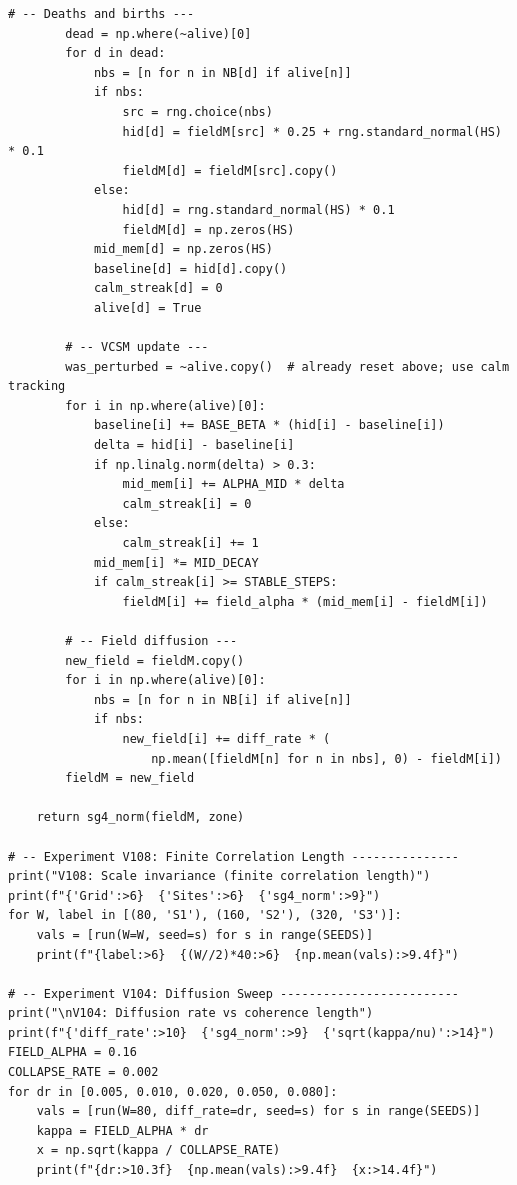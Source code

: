 \documentclass[11pt]{article}
\begin{document}
\begin{lstlisting}[caption={paper3\_propagation\_repro.py}]
        # -- Deaths and births ---
        dead = np.where(~alive)[0]
        for d in dead:
            nbs = [n for n in NB[d] if alive[n]]
            if nbs:
                src = rng.choice(nbs)
                hid[d] = fieldM[src] * 0.25 + rng.standard_normal(HS) * 0.1
                fieldM[d] = fieldM[src].copy()
            else:
                hid[d] = rng.standard_normal(HS) * 0.1
                fieldM[d] = np.zeros(HS)
            mid_mem[d] = np.zeros(HS)
            baseline[d] = hid[d].copy()
            calm_streak[d] = 0
            alive[d] = True

        # -- VCSM update ---
        was_perturbed = ~alive.copy()  # already reset above; use calm tracking
        for i in np.where(alive)[0]:
            baseline[i] += BASE_BETA * (hid[i] - baseline[i])
            delta = hid[i] - baseline[i]
            if np.linalg.norm(delta) > 0.3:
                mid_mem[i] += ALPHA_MID * delta
                calm_streak[i] = 0
            else:
                calm_streak[i] += 1
            mid_mem[i] *= MID_DECAY
            if calm_streak[i] >= STABLE_STEPS:
                fieldM[i] += field_alpha * (mid_mem[i] - fieldM[i])

        # -- Field diffusion ---
        new_field = fieldM.copy()
        for i in np.where(alive)[0]:
            nbs = [n for n in NB[i] if alive[n]]
            if nbs:
                new_field[i] += diff_rate * (
                    np.mean([fieldM[n] for n in nbs], 0) - fieldM[i])
        fieldM = new_field

    return sg4_norm(fieldM, zone)

# -- Experiment V108: Finite Correlation Length ---------------
print("V108: Scale invariance (finite correlation length)")
print(f"{'Grid':>6}  {'Sites':>6}  {'sg4_norm':>9}")
for W, label in [(80, 'S1'), (160, 'S2'), (320, 'S3')]:
    vals = [run(W=W, seed=s) for s in range(SEEDS)]
    print(f"{label:>6}  {(W//2)*40:>6}  {np.mean(vals):>9.4f}")

# -- Experiment V104: Diffusion Sweep -------------------------
print("\nV104: Diffusion rate vs coherence length")
print(f"{'diff_rate':>10}  {'sg4_norm':>9}  {'sqrt(kappa/nu)':>14}")
FIELD_ALPHA = 0.16
COLLAPSE_RATE = 0.002
for dr in [0.005, 0.010, 0.020, 0.050, 0.080]:
    vals = [run(W=80, diff_rate=dr, seed=s) for s in range(SEEDS)]
    kappa = FIELD_ALPHA * dr
    x = np.sqrt(kappa / COLLAPSE_RATE)
    print(f"{dr:>10.3f}  {np.mean(vals):>9.4f}  {x:>14.4f}")
\end{lstlisting}
\end{document}
